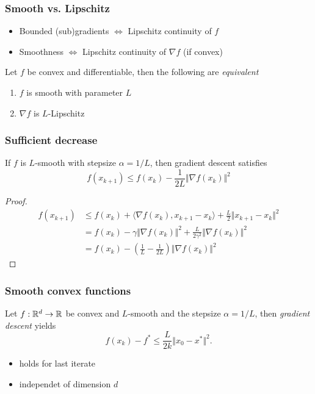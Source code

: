 \documentclass{beamer}
\begin{document}
\begin{frame}
  \frametitle{Smooth vs. Lipschitz}
  \begin{itemize}
    \item Bounded (sub)gradients $\Leftrightarrow$ Lipschitz continuity of $f$
    \item Smoothness $\Leftrightarrow$ Lipschitz continuity of $\nabla f$ (if convex)
  \end{itemize}

  \begin{lemma}%
    Let $f$ be convex and differentiable, then the following are \textit{equivalent}
    \begin{enumerate}
      \item $f$ is smooth with parameter $L$
      \item $\nabla f$ is $L$-Lipschitz
    \end{enumerate}
  \end{lemma}
\end{frame}


\begin{frame}
  \frametitle{Sufficient decrease}
  \begin{lemma}%
    If $f$ is $L$-smooth with stepsize $\alpha = 1/L$, then gradient descent satisfies
    \begin{equation}
      f(x_{k+1}) \le f(x_k) - \frac{1}{2L} \Vert \nabla f(x_k) \Vert^2
    \end{equation}
  \end{lemma}
  \begin{proof}
    \begin{equation}
      \begin{aligned}
        f(x_{k+1}) &\le f(x_k) + \langle \nabla f(x_k), x_{k+1}-x_k \rangle + \frac{L}{2}\Vert x_{k+1}-x_k \Vert^2 \\
        &= f(x_k) - \gamma \Vert \nabla f(x_k) \Vert^2 + \frac{L}{2 \gamma^2} \Vert \nabla f(x_k) \Vert^2 \\
        &= f(x_k) - \left(\frac{1}{L} - \frac{1}{2L}\right) \Vert \nabla f(x_k) \Vert^2
      \end{aligned}
    \end{equation}
  \end{proof}
\end{frame}


\begin{frame}
  \frametitle{Smooth convex functions}
  \begin{theorem}
    Let $f: \mathbb{R}^d \to \mathbb{R}$ be convex and $L$-smooth and the stepsize $\alpha=1/L$, then
    \emph{gradient descent} yields
    \begin{equation}
      f(x_k)-f^* \le \frac{L}{2k}\Vert x_0-x^* \Vert^2.
    \end{equation}
  \end{theorem}
  \begin{itemize}
    \item holds for last iterate
    \item independet of dimension $d$
  \end{itemize}
\end{frame}
\end{document}
